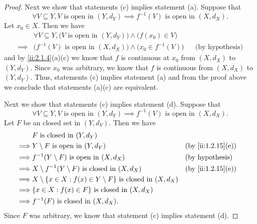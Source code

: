 \begin{proof}
  Next we show that statements (c) implies statement (a).
  Suppose that
  \[
    \forall V \subseteq Y, V \text{ is open in } (Y, d_Y) \implies f^{-1}(V) \text{ is open in } (X, d_X).
  \]
  Let \(x_0 \in X\).
  Then we have
  \begin{align*}
             & \forall V \subseteq Y, \big(V \text{ is open in } (Y, d_Y)\big) \land \big(f(x_0) \in V\big)                             \\
    \implies & \big(f^{-1}(V) \text{ is open in } (X, d_X)\big) \land \big(x_0 \in f^{-1}(V)\big)           &  & \text{(by hypothesis)}
  \end{align*}
  and by \cref{ii:2.1.4}(a)(c) we know that \(f\) is continuous at \(x_0\) from \((X, d_X)\) to \((Y, d_Y)\).
  Since \(x_0\) was arbitrary, we know that \(f\) is continuous from \((X, d_X)\) to \((Y, d_Y)\).
  Thus, statements (c) implies statement (a) and from the proof above we conclude that statements (a)(c) are equivalent.

  Next we show that statements (c) implies statement (d).
  Suppose that
  \[
    \forall V \subseteq Y, V \text{ is open in } (Y, d_Y) \implies f^{-1}(V) \text{ is open in } (X, d_X).
  \]
  Let \(F\) be an closed set in \((Y, d_Y)\).
  Then we have
  \begin{align*}
             & F \text{ is closed in } (Y, d_Y)                                                                              \\
    \implies & Y \setminus F \text{ is open in } (Y, d_Y)                                        &  & \by{ii:1.2.15}[e]      \\
    \implies & f^{-1}(Y \setminus F) \text{ is open in } (X, d_X)                                &  & \text{(by hypothesis)} \\
    \implies & X \setminus f^{-1}(Y \setminus F) \text{ is closed in } (X, d_X)                  &  & \by{ii:1.2.15}[e]      \\
    \implies & X \setminus \set{x \in X : f(x) \in Y \setminus F} \text{ is closed in } (X, d_X)                             \\
    \implies & \set{x \in X : f(x) \in F} \text{ is closed in } (X, d_X)                                                     \\
    \implies & f^{-1}(F) \text{ is closed in } (X, d_X).
  \end{align*}
  Since \(F\) was arbitrary, we know that statement (c) implies statement (d).


\end{proof}
